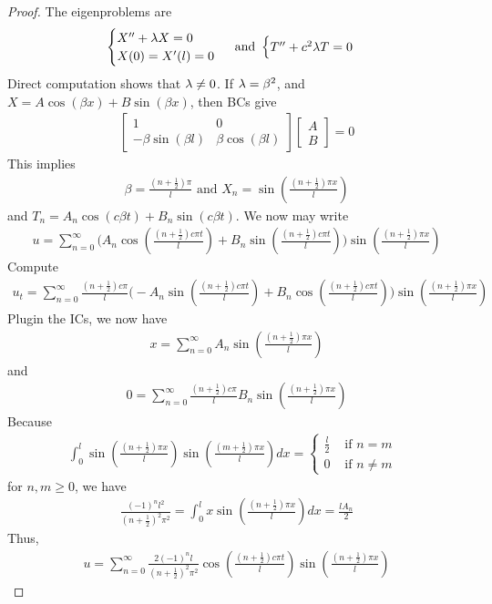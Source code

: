 \documentclass{report}
\begin{document}
\begin{proof}
The eigenproblems are 
\begin{align*}
\begin{cases}
  X''+ \lambda  X=0 \\
  X(0)=X'(l)=0
\end{cases} \text{ and }\begin{cases}
  T''+ c^2 \lambda T=0
\end{cases}
\end{align*}
Direct computation shows that $\lambda \neq 0$. If $\lambda=\beta ^2$, and $X= A \cos (\beta x)+B \sin (\beta x)$, then BCs give 
\begin{align*}
\begin{bmatrix}
  1 & 0 \\
  -\beta  \sin (\beta l) & \beta \cos (\beta l) 
\end{bmatrix} \begin{bmatrix}
A \\
B
\end{bmatrix}=0 
\end{align*}
This implies
\begin{align*}
\beta = \frac{(n+ \frac{1}{2})\pi }{l}\text{ and }X_n= \sin (\frac{(n+ \frac{1}{2})\pi  x}{l})
\end{align*}
and $T_n= A_n\cos (c \beta t)+ B_n \sin (c \beta t)$. We now may write 
\begin{align*}
u= \sum_{n=0}^{\infty} \Big(A_n \cos (\frac{(n+\frac{1}{2})c \pi t  }{l}) + B_n \sin (\frac{(n+\frac{1}{2})c \pi  t}{l})  \Big) \sin ( \frac{(n+ \frac{1}{2})\pi  x}{l})
\end{align*}
Compute 
\begin{align*}
u_t= \sum_{n=0}^{\infty} \frac{(n+ \frac{1}{2})c \pi  }{l}  \Big(-A_n  \sin  (\frac{(n+\frac{1}{2})c \pi t  }{l}) + B_n \cos (\frac{(n+\frac{1}{2})c \pi  t}{l})  \Big) \sin ( \frac{(n+ \frac{1}{2})\pi  x}{l})
\end{align*}
Plugin the ICs, we now have 
\begin{align*}
x=\sum_{n=0}^{\infty} A_n \sin (\frac{(n+ \frac{1}{2})\pi  x}{l})
\end{align*}
and 
\begin{align*}
0=\sum_{n=0}^{\infty} \frac{(n+ \frac{1}{2})c \pi  }{l}  B_n   \sin ( \frac{(n+ \frac{1}{2})\pi  x}{l})
\end{align*}
Because 
\begin{align*}
\int_0^l \sin (\frac{(n+\frac{1}{2})\pi  x}{l}) \sin ( \frac{(m+\frac{1}{2})\pi  x}{l}) dx= \begin{cases}
  \frac{l}{2}& \text{ if $n=m$ }\\
  0& \text{ if $n\neq m$ }
\end{cases}
\end{align*}
for $n,m\geq 0$, we have 
\begin{align*}
\frac{(-1)^nl^2}{(n+ \frac{1}{2})^2 \pi ^2}=\int_0^l x \sin (\frac{(n+ \frac{1}{2})\pi  x}{l})dx = \frac{lA_n}{2}
\end{align*}
Thus, 
\begin{align*}
u=\sum_{n=0}^{\infty} \frac{2(-1)^n l}{(n+\frac{1}{2})^2 \pi ^2} \cos ( \frac{(n+ \frac{1}{2})c \pi  t}{l}) \sin ( \frac{(n+ \frac{1}{2})\pi  x}{l})
\end{align*}
\end{proof}
\end{document}
